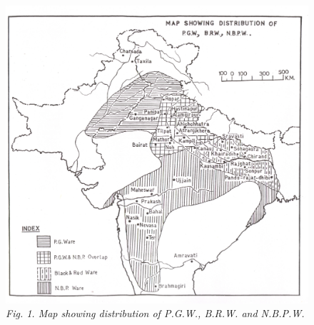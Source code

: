 \begin{figure}[H]
\includegraphics[scale=.5]{images/chapter-1/fig001.jpg}
\caption{\textit{Fig. 1. Map showing distribution of P.G.W., B.R.W. and N.B.P.W.}}\label{chapter1-fig001}
\end{figure}

